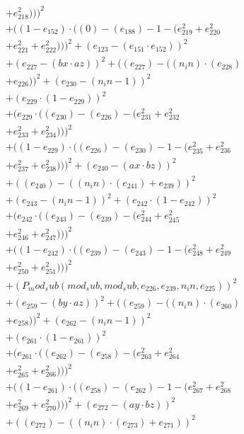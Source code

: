 \documentclass[10pt, a4paper]{article}
\begin{document}
\begin{align*}
& + e_{218}^{2})))^{2} \\
& + ((1 - e_{152})  \cdot  ((0) - (e_{188}) - 1 - (e_{219}^{2} + e_{220}^{2} \\
& + e_{221}^{2} + e_{222}^{2})))^{2} + (e_{123} - (e_{151}  \cdot  e_{152}))^{2} \\
& + (e_{227} - (bx  \cdot  az))^{2} + ((e_{227}) - ((n_in)  \cdot  (e_{228}) \\
& + e_{226}))^{2} + (e_{230} - (n_in - 1))^{2} \\
& + (e_{229}  \cdot  (1 - e_{229}))^{2} \\
& + (e_{229}  \cdot  ((e_{230}) - (e_{226}) - (e_{231}^{2} + e_{232}^{2} \\
& + e_{233}^{2} + e_{234}^{2})))^{2} \\
& + ((1 - e_{229})  \cdot  ((e_{226}) - (e_{230}) - 1 - (e_{235}^{2} + e_{236}^{2} \\
& + e_{237}^{2} + e_{238}^{2})))^{2} + (e_{240} - (ax  \cdot  bz))^{2} \\
& + ((e_{240}) - ((n_in)  \cdot  (e_{241}) + e_{239}))^{2} \\
& + (e_{243} - (n_in - 1))^{2} + (e_{242}  \cdot  (1 - e_{242}))^{2} \\
& + (e_{242}  \cdot  ((e_{243}) - (e_{239}) - (e_{244}^{2} + e_{245}^{2} \\
& + e_{246}^{2} + e_{247}^{2})))^{2} \\
& + ((1 - e_{242})  \cdot  ((e_{239}) - (e_{243}) - 1 - (e_{248}^{2} + e_{249}^{2} \\
& + e_{250}^{2} + e_{251}^{2})))^{2} \\
& + (P_mod_sub(mod_sub, mod_sub, e_{226}, e_{239}, n_in, e_{225}))^{2} \\
& + (e_{259} - (by  \cdot  az))^{2} + ((e_{259}) - ((n_in)  \cdot  (e_{260}) \\
& + e_{258}))^{2} + (e_{262} - (n_in - 1))^{2} \\
& + (e_{261}  \cdot  (1 - e_{261}))^{2} \\
& + (e_{261}  \cdot  ((e_{262}) - (e_{258}) - (e_{263}^{2} + e_{264}^{2} \\
& + e_{265}^{2} + e_{266}^{2})))^{2} \\
& + ((1 - e_{261})  \cdot  ((e_{258}) - (e_{262}) - 1 - (e_{267}^{2} + e_{268}^{2} \\
& + e_{269}^{2} + e_{270}^{2})))^{2} + (e_{272} - (ay  \cdot  bz))^{2} \\
& + ((e_{272}) - ((n_in)  \cdot  (e_{273}) + e_{271}))^{2} \\

\end{align*}
\end{document}
